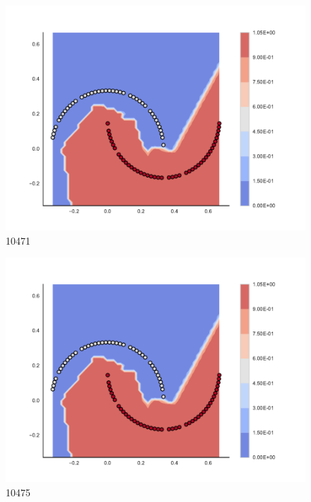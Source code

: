 \begin{subfigure}[b]{0.09\textwidth}
    \includegraphics[clip, trim=2.35cm 1.75cm 4.5cm 0cm,width=\textwidth]{img/convergence/10471.pdf}
    \caption{10471}
    \label{fig:convergence_10471}
\end{subfigure}
%
\begin{subfigure}[b]{0.09\textwidth}
    \includegraphics[clip, trim=2.35cm 1.75cm 4.5cm 0cm,width=\textwidth]{img/convergence/10475.pdf}
    \caption{10475}
    \label{fig:convergence_10475}
\end{subfigure}
%
